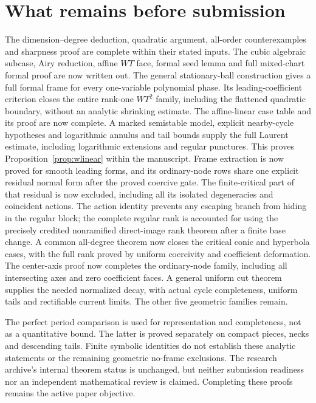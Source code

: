 \documentclass[11pt]{article}
\theoremstyle{definition}\newtheorem{definition}[theorem]{Definition}
\theoremstyle{remark}\newtheorem{remark}[theorem]{Remark}
\begin{document}
\section*{What remains before submission}
The dimension--degree deduction, quadratic argument, all-order
counterexamples and sharpness proof are complete within their stated
inputs. The cubic algebraic subcase, Airy reduction, affine $WT$ face,
formal seed lemma and full mixed-chart formal proof are now written out.
The general stationary-ball construction gives a full formal frame
for every one-variable polynomial phase. Its leading-coefficient
criterion closes the entire rank-one $WT^2$ family, including the
flattened quadratic boundary, without an analytic shrinking estimate.
The affine-linear case table and its proof are now complete.
A marked semistable model, explicit nearby-cycle hypotheses and
logarithmic annulus and tail bounds supply the full Laurent estimate,
including logarithmic extensions and regular punctures. This proves
Proposition~\ref{prop:wlinear} within the manuscript. Frame extraction
is now proved for smooth leading forms, and its ordinary-node rows
share one explicit residual normal form after the proved coercive gate.
The finite-critical part of that residual is now excluded, including all
its isolated degeneracies and coincident actions. The action identity
prevents any escaping branch from hiding in the regular block; the
complete regular rank is accounted for using the precisely credited
nonramified direct-image rank theorem after a finite base change.
A common all-degree theorem now closes the critical conic and
hyperbola cases, with the full rank proved by uniform coercivity
and coefficient deformation. The center-axis proof now completes the ordinary-node family,
including all intersecting axes and zero coefficient faces. A general
uniform cut theorem supplies the needed normalized decay, with actual
cycle completeness, uniform tails and rectifiable current limits.
The other five geometric families remain.

The perfect period comparison is used for representation and
completeness, not as a quantitative bound. The latter is proved
separately on compact pieces, necks and descending tails. Finite
symbolic identities do not establish these analytic statements or
the remaining geometric no-frame exclusions. The research archive's
internal theorem status is unchanged, but neither
submission readiness nor an independent mathematical review is claimed.
Completing these proofs remains the active paper objective.
\end{document}

